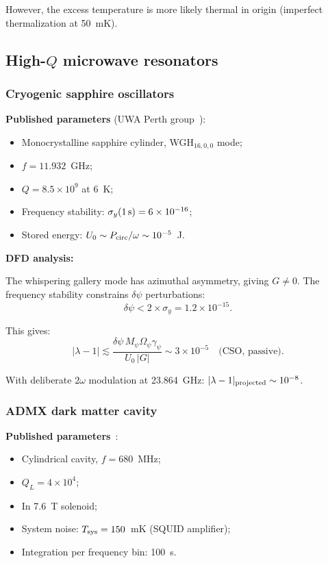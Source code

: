\documentclass[12pt,aps,prd,twocolumn,superscriptaddress,nofootinbib]{revtex4-2}
\newcommand{\Opsi}{\Omega_\psi}
\newcommand{\gpsi}{\gamma_\psi}
\newcommand{\Mpsi}{M_\psi}
\begin{document}
However, the excess temperature is more likely thermal in origin
(imperfect thermalization at 50~mK).

\subsection{High-$Q$ microwave resonators}

\subsubsection{Cryogenic sapphire oscillators}
\label{sec:cso}

\textbf{Published parameters} (UWA Perth group~\cite{Hartnett2006}):
\begin{itemize}[noitemsep]
\item Monocrystalline sapphire cylinder, WGH$_{16,0,0}$ mode;
\item $f = 11.932$~GHz;
\item $Q = 8.5\times10^9$ at $6$~K;
\item Frequency stability: $\sigma_y(1\,{\rm s}) = 6\times10^{-16}$;
\item Stored energy: $U_0 \sim P_{\rm circ}/\omega \sim 10^{-5}$~J.
\end{itemize}

\textbf{DFD analysis:}

The whispering gallery mode has azimuthal asymmetry, giving
$G \neq 0$.  The frequency stability constrains $\delta\psi$
perturbations:
\begin{equation}
\delta\psi < 2\times\sigma_y = 1.2\times10^{-15}.
\label{eq:cso_dpsi}
\end{equation}

This gives:
\begin{equation}
|\lambda-1| \lesssim \frac{\delta\psi\,\Mpsi\Opsi\gpsi}{U_0\,|G|}
\sim 3\times10^{-5}
\quad\text{(CSO, passive)}.
\label{eq:cso_bound}
\end{equation}

With deliberate $2\omega$ modulation at 23.864~GHz:
$|\lambda-1|_{\rm projected} \sim 10^{-8}$.

\subsubsection{ADMX dark matter cavity}
\label{sec:admx}

\textbf{Published parameters}~\cite{Du2018}:
\begin{itemize}[noitemsep]
\item Cylindrical cavity, $f = 680$~MHz;
\item $Q_L = 4\times10^4$;
\item In 7.6~T solenoid;
\item System noise: $T_{\rm sys} = 150$~mK (SQUID amplifier);
\item Integration per frequency bin: 100~s.
\end{itemize}
\end{document}
